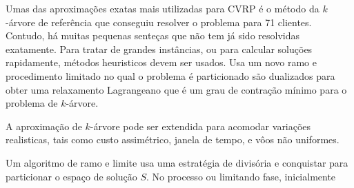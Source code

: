 \documentclass[a4paer, 12pt]{article}
\begin{document}
 Umas das aproximações exatas mais utilizadas para CVRP é o método da $k$-árvore de {\color{red}
referência} que conseguiu resolver o problema para 71 clientes. Contudo, há muitas pequenas senteças
que não tem já sido resolvidas exatamente. Para tratar de grandes instâncias, ou para calcular
soluções rapidamente, métodos heuristicos devem ser usados. Usa um novo ramo e procedimento
limitado no qual o problema é particionado são dualizados para obter uma relaxamento Lagrangeano que
é um grau de contração mínimo para o problema de $k$-árvore.

 A aproximação de $k$-árvore pode ser extendida para acomodar variações realisticas, tais como custo
assimétrico, janela de tempo, e vôos não uniformes.

 Um algoritmo de ramo e limite usa uma estratégia de divisória e conquistar para particionar o
espaço de solução $S$. No processo ou limitando fase, inicialmente 
\end{document}
